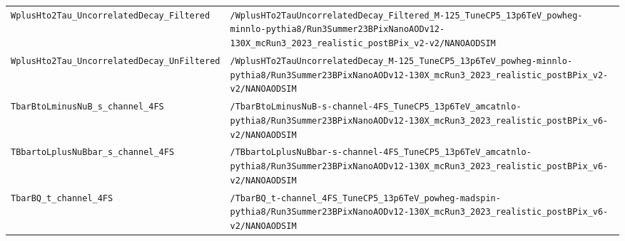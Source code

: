 \begin{longtable}{@{}>{\RaggedRight\arraybackslash}p{} >{\RaggedRight\arraybackslash}p{}@{}}
\addlinespace[2pt]
\texttt{WplusHto2Tau\_\allowbreak{}UncorrelatedDecay\_\allowbreak{}Filtered} & \texttt{/\allowbreak{}WplusHTo2TauUncorrelatedDecay\_\allowbreak{}Filtered\_\allowbreak{}M-\allowbreak{}125\_\allowbreak{}TuneCP5\_\allowbreak{}13p6TeV\_\allowbreak{}powheg-\allowbreak{}minnlo-\allowbreak{}pythia8/\allowbreak{}Run3Summer23BPixNanoAODv12-\allowbreak{}130X\_\allowbreak{}mcRun3\_\allowbreak{}2023\_\allowbreak{}realistic\_\allowbreak{}postBPix\_\allowbreak{}v2-\allowbreak{}v2/\allowbreak{}NANOAODSIM} \\
\addlinespace[2pt]
\texttt{WplusHto2Tau\_\allowbreak{}UncorrelatedDecay\_\allowbreak{}UnFiltered} & \texttt{/\allowbreak{}WplusHTo2TauUncorrelatedDecay\_\allowbreak{}M-\allowbreak{}125\_\allowbreak{}TuneCP5\_\allowbreak{}13p6TeV\_\allowbreak{}powheg-\allowbreak{}minnlo-\allowbreak{}pythia8/\allowbreak{}Run3Summer23BPixNanoAODv12-\allowbreak{}130X\_\allowbreak{}mcRun3\_\allowbreak{}2023\_\allowbreak{}realistic\_\allowbreak{}postBPix\_\allowbreak{}v2-\allowbreak{}v2/\allowbreak{}NANOAODSIM} \\
\addlinespace[2pt]
\texttt{TbarBtoLminusNuB\_\allowbreak{}s\_\allowbreak{}channel\_\allowbreak{}4FS} & \texttt{/\allowbreak{}TbarBtoLminusNuB-\allowbreak{}s-\allowbreak{}channel-\allowbreak{}4FS\_\allowbreak{}TuneCP5\_\allowbreak{}13p6TeV\_\allowbreak{}amcatnlo-\allowbreak{}pythia8/\allowbreak{}Run3Summer23BPixNanoAODv12-\allowbreak{}130X\_\allowbreak{}mcRun3\_\allowbreak{}2023\_\allowbreak{}realistic\_\allowbreak{}postBPix\_\allowbreak{}v6-\allowbreak{}v2/\allowbreak{}NANOAODSIM} \\
\addlinespace[2pt]
\texttt{TBbartoLplusNuBbar\_\allowbreak{}s\_\allowbreak{}channel\_\allowbreak{}4FS} & \texttt{/\allowbreak{}TBbartoLplusNuBbar-\allowbreak{}s-\allowbreak{}channel-\allowbreak{}4FS\_\allowbreak{}TuneCP5\_\allowbreak{}13p6TeV\_\allowbreak{}amcatnlo-\allowbreak{}pythia8/\allowbreak{}Run3Summer23BPixNanoAODv12-\allowbreak{}130X\_\allowbreak{}mcRun3\_\allowbreak{}2023\_\allowbreak{}realistic\_\allowbreak{}postBPix\_\allowbreak{}v6-\allowbreak{}v2/\allowbreak{}NANOAODSIM} \\
\addlinespace[2pt]
\texttt{TbarBQ\_\allowbreak{}t\_\allowbreak{}channel\_\allowbreak{}4FS} & \texttt{/\allowbreak{}TbarBQ\_\allowbreak{}t-\allowbreak{}channel\_\allowbreak{}4FS\_\allowbreak{}TuneCP5\_\allowbreak{}13p6TeV\_\allowbreak{}powheg-\allowbreak{}madspin-\allowbreak{}pythia8/\allowbreak{}Run3Summer23BPixNanoAODv12-\allowbreak{}130X\_\allowbreak{}mcRun3\_\allowbreak{}2023\_\allowbreak{}realistic\_\allowbreak{}postBPix\_\allowbreak{}v6-\allowbreak{}v2/\allowbreak{}NANOAODSIM} \\

\end{longtable}
